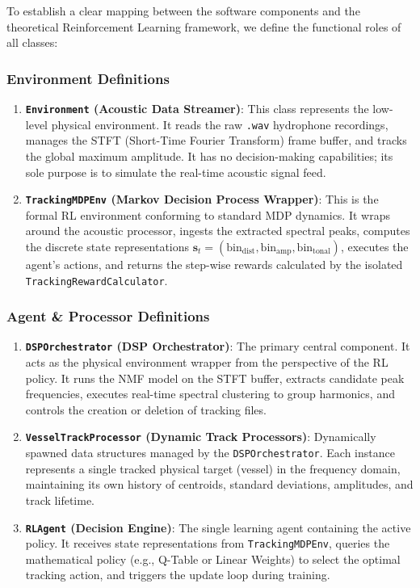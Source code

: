 \documentclass[12pt,a4paper]{article}
\begin{document}
To establish a clear mapping between the software components and the theoretical Reinforcement Learning framework, we define the functional roles of all classes:

\subsubsection{Environment Definitions}
\begin{enumerate}
    \item \textbf{\texttt{Environment} (Acoustic Data Streamer)}: This class represents the low-level physical environment. It reads the raw \texttt{.wav} hydrophone recordings, manages the STFT (Short-Time Fourier Transform) frame buffer, and tracks the global maximum amplitude. It has no decision-making capabilities; its sole purpose is to simulate the real-time acoustic signal feed.
    \item \textbf{\texttt{TrackingMDPEnv} (Markov Decision Process Wrapper)}: This is the formal RL environment conforming to standard MDP dynamics. It wraps around the acoustic processor, ingests the extracted spectral peaks, computes the discrete state representations $\mathbf{s}_t = (\text{bin}_{\text{dist}}, \text{bin}_{\text{amp}}, \text{bin}_{\text{tonal}})$, executes the agent's actions, and returns the step-wise rewards calculated by the isolated \texttt{TrackingRewardCalculator}.
\end{enumerate}

\subsubsection{Agent \& Processor Definitions}
\begin{enumerate}
    \item \textbf{\texttt{DSPOrchestrator} (DSP Orchestrator)}: The primary central component. It acts as the physical environment wrapper from the perspective of the RL policy. It runs the NMF model on the STFT buffer, extracts candidate peak frequencies, executes real-time spectral clustering to group harmonics, and controls the creation or deletion of tracking files.
    \item \textbf{\texttt{VesselTrackProcessor} (Dynamic Track Processors)}: Dynamically spawned data structures managed by the \texttt{DSPOrchestrator}. Each instance represents a single tracked physical target (vessel) in the frequency domain, maintaining its own history of centroids, standard deviations, amplitudes, and track lifetime.
    \item \textbf{\texttt{RLAgent} (Decision Engine)}: The single learning agent containing the active policy. It receives state representations from \texttt{TrackingMDPEnv}, queries the mathematical policy (e.g., Q-Table or Linear Weights) to select the optimal tracking action, and triggers the update loop during training.
\end{enumerate}
\end{document}
